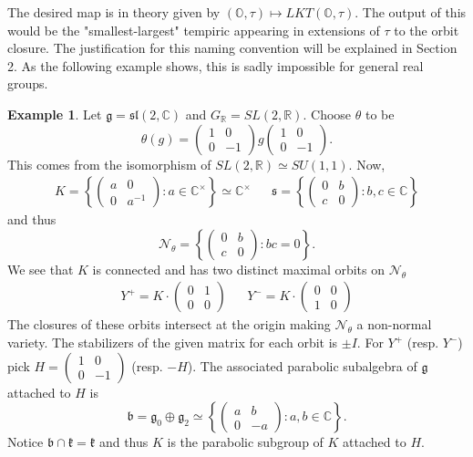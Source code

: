 \documentclass[letterpaper,twosided,11pt]{article}
\theoremstyle{plain}
\theoremstyle{definition}
\newtheorem{example}{Example}
\theoremstyle{remark}
\newcommand{\C}{\mathbb{C}}
\newcommand{\R}{\mathbb{R}}
\newcommand{\OO}{\mathbb{O}}
\newcommand{\Mat}[1]{\begin{pmatrix}#1\end{pmatrix}}
\newcommand{\ds}{\oplus}
\newcommand{\lie}[1]{\mathfrak{#1}}
\begin{document}
The desired map is in theory given by $(\OO,\tau)\mapsto LKT(\OO,\tau).$ The output of this would be the "smallest-largest" tempiric appearing in extensions of $\tau$ to the orbit closure. The justification for this naming convention will be explained in Section 2. As the following example shows, this is sadly impossible for general real groups.    

\begin{example} 
	Let $\lie{g}=\lie{sl}(2,\C)$ and $G_\R=SL(2,\R).$ Choose $\theta$ to be \[ \theta(g)=\Mat{1 & 0 \\ 0 & -1} g \Mat{1 & 0 \\ 0 & -1}. \] This comes from the isomorphism of $SL(2,\R)\simeq SU(1,1).$ 
	Now, \begin{align*} K=\left\{ \Mat{a & 0 \\ 0 & a^{-1}}: a\in \C^\times\right\}\simeq \C^\times  &&  \lie{s}=\left\{\Mat{0 & b \\ c & 0}: b,c\in \C\right\}\end{align*}  and thus \[ \mathcal{N}_\theta=\left\{ \Mat{0 & b \\ c & 0}: bc=0\right\}.\]
	We see that $K$ is connected and has two distinct maximal orbits on $\mathcal{N}_\theta$ \begin{align*} Y^+=K\cdot \Mat{0 & 1 \\ 0 & 0} && Y^-=K\cdot \Mat{0 & 0 \\ 1 & 0} \end{align*} 
	The closures of these orbits intersect at the origin making $\mathcal{N}_\theta$ a non-normal variety. The stabilizers of the given matrix for each orbit is $\pm I.$ For $Y^+$ (resp. $Y^-$) pick $H=\Mat{1 &0 \\ 0 & -1}$ (resp. $-H$). The associated parabolic subalgebra of $\lie{g}$ attached to $H$ is \[ \lie{b}=\lie{g}_0\ds \lie{g}_2\simeq \left\{\Mat{a & b \\ 0 & -a}: a,b\in \C \right\}.\] Notice $\lie{b}\cap \lie{k}=\lie{k}$ and thus $K$ is the parabolic subgroup of $K$ attached to $H.$ 
	

\end{example}
\end{document}
